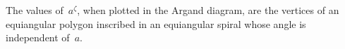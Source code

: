 The values of~$a^{\zeta}$, when plotted in the Argand diagram, are the vertices
of an equiangular polygon inscribed in an equiangular spiral whose angle is
independent of~$a$. 

